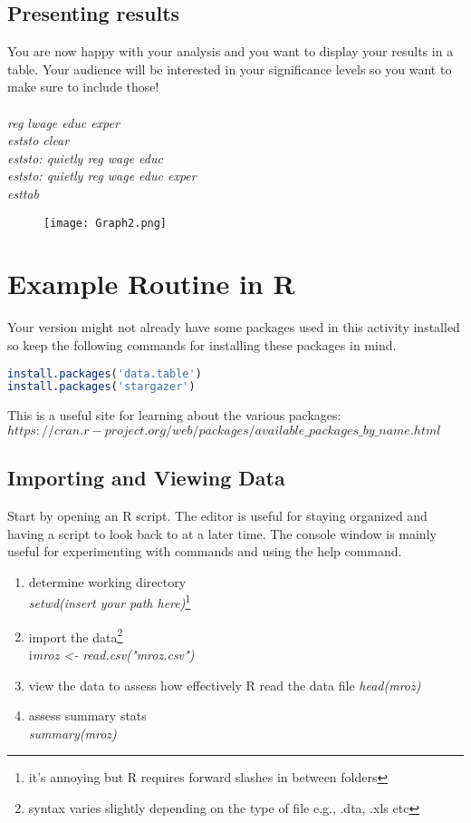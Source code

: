 \documentclass[12pt]{article}%
\begin{document}
\subsection{Presenting results}
You are now happy with your analysis and you want to display your results in a table. Your audience will be interested in your significance levels so you want to make sure to include those!\\
\textit{\\
reg lwage educ exper\\
eststo clear\\
eststo: quietly reg wage educ\\
eststo: quietly reg wage educ exper\\
esttab}

\begin{figure}[h]\centering
\texttt{[image: Graph2.png]}
\end{figure}





\section{Example Routine in R} 
Your version might not already have some packages used in this activity installed so keep the following commands for installing these packages in mind. 

\begin{lstlisting}[language=R]
install.packages('data.table')
install.packages('stargazer')
\end{lstlisting}

This is a useful site for learning about the various packages:\\ $https://cran.r-project.org/web/packages/available\_packages\_by\_name.html$

\subsection {Importing and Viewing Data}
Start by opening an R script. The editor is useful for staying organized and having a script to look back to at a later time. The console window is mainly useful for experimenting with commands and using the help command. 
\begin{enumerate}
\item determine working directory \\
\textit{setwd(insert your path here)}\footnote{it's annoying but R requires forward slashes in between folders}
\item import the data\footnote{syntax varies slightly depending on the type of file e.g., .dta, .xls etc} \\ i\textit{mroz <- read.csv("mroz.csv")}
\item view the data to assess how effectively R read the data file \textit{head(mroz)}
\item assess summary stats \\ \textit{summary(mroz)} 
\end{enumerate}
\end{document}
